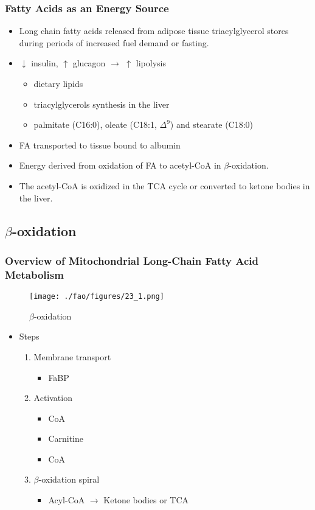 \documentclass{scrartcl}
\begin{document}
\subsubsection{Fatty Acids as an Energy Source}
\label{sec:org52b5e41}

\begin{itemize}
\item Long chain fatty acids released from adipose tissue triacylglycerol
stores during periods of increased fuel demand or fasting.
\item \(\downarrow\) insulin, \(\uparrow\) glucagon \(\to\) \(\uparrow\) lipolysis
\begin{itemize}
\item dietary lipids
\item triacylglycerols synthesis in the liver
\item palmitate (C16:0), oleate (C18:1, \(\Delta^{\text{9}}\)) and stearate (C18:0)
\end{itemize}
\item FA transported to tissue bound to albumin
\item Energy derived from oxidation of FA to acetyl-CoA in \(\beta\)-oxidation.
\item The acetyl-CoA is oxidized in the TCA cycle or converted to ketone bodies in the liver.
\end{itemize}

\subsection{\(\beta\)-oxidation}
\label{sec:orga607910}
\subsubsection{Overview of Mitochondrial Long-Chain Fatty Acid Metabolism}
\label{sec:orgd72905b}

\begin{figure}[htbp]
\centering
\texttt{[image: ./fao/figures/23\_1.png]}
\caption{\label{fig:org261ce96}
\(\beta\)-oxidation}
\end{figure}

\begin{itemize}
\item Steps 
\begin{enumerate}
\item Membrane transport
\begin{itemize}
\item FaBP
\end{itemize}
\item Activation
\begin{itemize}
\item CoA
\item Carnitine
\item CoA
\end{itemize}
\item \(\beta\)-oxidation spiral
\begin{itemize}
\item Acyl-CoA \(\to\) Ketone bodies or TCA
\end{itemize}
\end{enumerate}
\end{itemize}
\end{document}
